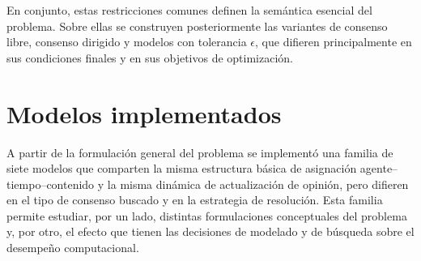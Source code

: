 \documentclass[10pt,letterpaper]{article}
\begin{document}
En conjunto, estas restricciones comunes definen la sem\'antica esencial del problema. Sobre ellas se construyen posteriormente las variantes de consenso libre, consenso dirigido y modelos con tolerancia \(\epsilon\), que difieren principalmente en sus condiciones finales y en sus objetivos de optimizaci\'on.

\section{Modelos implementados}

A partir de la formulaci\'on general del problema se implement\'o una familia de siete modelos que comparten la misma estructura b\'asica de asignaci\'on agente--tiempo--contenido y la misma din\'amica de actualizaci\'on de opini\'on, pero difieren en el tipo de consenso buscado y en la estrategia de resoluci\'on. Esta familia permite estudiar, por un lado, distintas formulaciones conceptuales del problema y, por otro, el efecto que tienen las decisiones de modelado y de b\'usqueda sobre el desempe\~no computacional.
\end{document}
